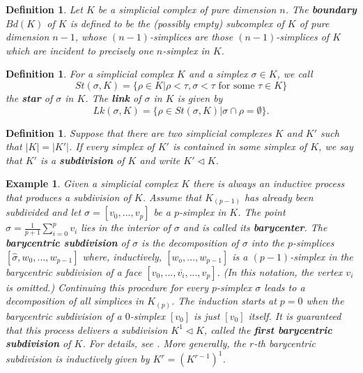 \documentclass{scrreprt}
\newtheorem{definition}[prop]{Definition}
\newtheorem{example}[prop]{Example}
\begin{document}
\begin{definition}
Let $K$ be a simplicial complex of pure dimension $n$. The \textbf{boundary} $Bd(K)$ of $K$ is defined to be the (possibly empty) subcomplex of $K$ of pure dimension $n-1$, whose $(n-1)$-simplices are those $(n-1)$-simplices of $K$ which are incident to precisely one $n$-simplex in $K$.
\end{definition}

\begin{definition}
For a simplicial complex $K$ and a simplex $\sigma \in K$, we call
\begin{equation*}
St(\sigma,K)= \{ \rho \in K | \rho < \tau, \sigma < \tau \text{ for some } \tau \in K \}  
\end{equation*}
the \textbf{star} of $\sigma$ in $K$. The \textbf{link} of $\sigma$ in $K$ is given by
\begin{equation*}
Lk(\sigma,K) = \{ \rho \in St(\sigma,K) | \sigma \cap \rho = \emptyset \}.
\end{equation*}
\end{definition}

\begin{definition}
Suppose that there are two simplicial complexes $K$ and $K'$ such that $|K| = |K'|$. If every simplex of $K'$ is contained in some simplex of $K$, we say that $K'$ is a \textbf{subdivision} of $K$ and write $K' \lhd K$.
\end{definition}


\begin{example}
Given a simplicial complex $K$ there is always an inductive process that produces a subdivision of $K$. Assume that $K_{(p-1)}$ has already been subdivided and let $\sigma=[v_0,...,v_p]$ be a $p$-simplex in $K$. The point $\hat{\sigma}=\frac{1}{p+1} \sum_{i=0}^p v_i$ lies in the interior of $\sigma$ and is called its \textbf{barycenter}. The \textbf{barycentric subdivision} of $\sigma$ is the decomposition of $\sigma$ into the $p$-simplices $[\hat{\sigma},w_0,...,w_{p-1}]$ where, inductively, $[w_o,...,w_{p-1}]$ is a $(p-1)$-simplex in the barycentric subdivision of a face $[v_0,...,\overline{v_i},...,v_p]$. (In this notation, the vertex $v_i$ is omitted.) Continuing this procedure for every $p$-simplex $\sigma$ leads to a decomposition of all simplices in $K_{(p)}$. The induction starts at $p=0$ when the barycentric subdivision of a $0$-simplex $[v_0]$ is just $[v_0]$ itself. It is guaranteed that this process delivers a subdivision $K^1 \lhd K$, called the \textbf{first barycentric subdivision} of $K$. For details, see \cite{hatcher}. More generally, the $r$-th barycentric subdivision is inductively given by $K^r=(K^{r-1})^1$.
\end{example}
\end{document}
